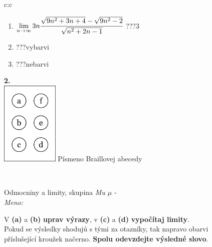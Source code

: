 \documentclass[10pt]{report}
\begin{document}
\begin{tabular}{c:c}
\begin{minipage}[c][104.5mm][t]{0.5\linewidth}
\begin{center}
\begin{minipage}{0.79\linewidth}
\begin{center}
\begin{varwidth}{\linewidth}
\begin{enumerate}
\item $\lim\limits_{n\to\infty}3n\cfrac{\sqrt{9n^2+3n+4}-\sqrt{9n^2-2}}{\sqrt{n^2+2n-1}}$\quad \dotfill\; ???\;\dotfill \quad $3$
\item \quad \dotfill\; ???\;\dotfill \quad vybarvi
\item \quad \dotfill\; ???\;\dotfill \quad nebarvi
\end{enumerate}
\end{varwidth}
\end{center}
\end{minipage}
\begin{minipage}{0.20\linewidth}
\begin{center}
{\Huge\bfseries 2.} \\[2mm]
\includegraphics[height=40mm]{../images/braille.png}
{\small Písmeno Braillovej abecedy}
\end{center}
\end{minipage}
\end{center}
\end{minipage}
\\ \hdashline
\begin{minipage}[c][104.5mm][t]{0.5\linewidth}
\begin{center}
\vspace{7mm}
{\huge Odmocniny a limity, skupina \textit{Mu $\mu$} -}\\[5mm]
\textit{Meno:}\phantom{xxxxxxxxxxxxxxxxxxxxxxxxxxxxxxxxxxxxxxxxxxxxxxxxxxxxxxxxxxxxxxxxx}\\[5mm]
\begin{minipage}{0.95\linewidth}
\begin{center}
V \textbf{(a)} a \textbf{(b)} \textbf{uprav výrazy}, v \textbf{(c)} a \textbf{(d)} \textbf{vypočítaj limity}.\\Pokud se výsledky shodujú s tými za otazníky, tak napravo obarvi\\příslušející kroužek načerno. \textbf{Spolu odevzdejte výsledné slovo}.
\end{center}
\end{minipage}
\\[1mm]

\end{center}
\end{minipage}
\end{tabular}
\end{document}
